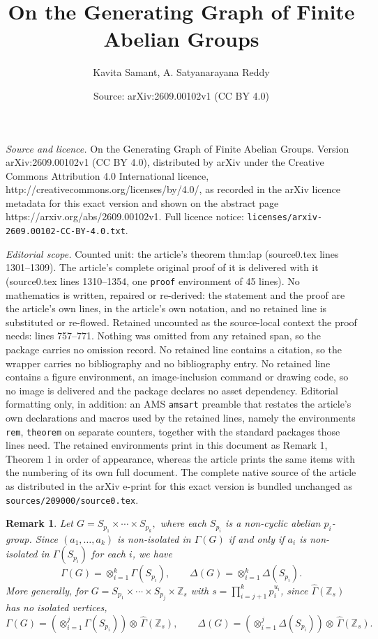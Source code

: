 \documentclass[10pt,a4paper]{amsart}
\title{On the Generating Graph of Finite Abelian Groups}
\author{Kavita Samant, A. Satyanarayana Reddy}
\date{Source: arXiv:2609.00102v1 (CC BY 4.0)}
\newtheorem{rem}{Remark}
\begin{document}
\maketitle

\noindent\emph{Source and licence.} On the Generating Graph of Finite Abelian Groups. Version arXiv:2609.00102v1 (CC BY 4.0), distributed by arXiv under the Creative Commons Attribution 4.0 International licence, http://creativecommons.org/licenses/by/4.0/, as recorded in the arXiv licence metadata for this exact version and shown on the abstract page https://arxiv.org/abs/2609.00102v1. Full licence notice: \texttt{licenses/arxiv-2609.00102-CC-BY-4.0.txt}.\par\smallskip

\noindent\textit{Editorial scope.} Counted unit: the article's theorem thm:lap (source0.tex lines 1301--1309). The article's complete original proof of it is delivered with it (source0.tex lines 1310--1354, one \texttt{proof} environment of 45 lines). No mathematics is written, repaired or re-derived: the statement and the proof are the article's own lines, in the article's own notation, and no retained line is substituted or re-flowed.  Retained uncounted as the source-local context the proof needs: lines 757--771.  Nothing was omitted from any retained span, so the package carries no omission record.  No retained line contains a citation, so the wrapper carries no bibliography and no bibliography entry.  No retained line contains a figure environment, an image-inclusion command or drawing code, so no image is delivered and the package declares no asset dependency.  Editorial formatting only, in addition: an AMS \texttt{amsart} preamble that restates the article's own declarations and macros used by the retained lines, namely the environments \texttt{rem}, \texttt{theorem} on separate counters, together with the standard packages those lines need.  The retained environments print in this document as Remark 1, Theorem 1 in order of appearance, whereas the article prints the same items with the numbering of its own full document.  The complete native source of the article as distributed in the arXiv e-print for this exact version is bundled unchanged as \texttt{sources/209000/source0.tex}.
\begin{rem}\label{rem:decompose}
        Let $G = S_{p_1}\times\cdots\times S_{p_k},$ where each $S_{p_i}$ is 
        a non-cyclic abelian $p_i$-group. Since $(a_1,\ldots,a_k)$ is 
        non-isolated in $\Gamma(G)$ if and only if $a_i$ is non-isolated in 
        $\Gamma(S_{p_i})$ for each $i$, we have
        $$\Gamma(G) = \otimes_{i=1}^{k}\Gamma(S_{p_i}), \qquad 
        \Delta(G) = \otimes_{i=1}^{k}\Delta(S_{p_i}).$$
        More generally, for $G = S_{p_1}\times\cdots\times S_{p_j}\times 
        \mathbb{Z}_s$ with $s = \prod\limits_{i=j+1}^{k}p_i^{u_i}$, since 
        $\widehat{\Gamma}(\mathbb{Z}_s)$ has no isolated vertices,
        $$\Gamma(G) = \left(\otimes_{i=1}^{j}\Gamma(S_{p_i})\right)
        \otimes\,\widehat{\Gamma}(\mathbb{Z}_s), \qquad \Delta(G) = 
        \left(\otimes_{i=1}^{j}\Delta(S_{p_i})\right)\otimes\,
        \widehat{\Gamma}(\mathbb{Z}_s).$$
\end{rem}
\end{document}

